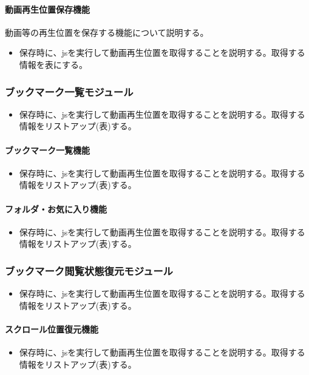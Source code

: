 \paragraph{動画再生位置保存機能}
動画等の再生位置を保存する機能について説明する。
\begin{itemize}
  \item 保存時に、jsを実行して動画再生位置を取得することを説明する。取得する情報を表にする。
\end{itemize}

\subsubsection{ブックマーク一覧モジュール}
\begin{itemize}
  \item 保存時に、jsを実行して動画再生位置を取得することを説明する。取得する情報をリストアップ(表)する。
\end{itemize}

\paragraph{ブックマーク一覧機能}
\begin{itemize}
  \item 保存時に、jsを実行して動画再生位置を取得することを説明する。取得する情報をリストアップ(表)する。
\end{itemize}

\paragraph{フォルダ・お気に入り機能}
\begin{itemize}
  \item 保存時に、jsを実行して動画再生位置を取得することを説明する。取得する情報をリストアップ(表)する。
\end{itemize}

\subsubsection{ブックマーク閲覧状態復元モジュール}
\begin{itemize}
  \item 保存時に、jsを実行して動画再生位置を取得することを説明する。取得する情報をリストアップ(表)する。
\end{itemize}

\paragraph{スクロール位置復元機能}
\begin{itemize}
  \item 保存時に、jsを実行して動画再生位置を取得することを説明する。取得する情報をリストアップ(表)する。
\end{itemize}

